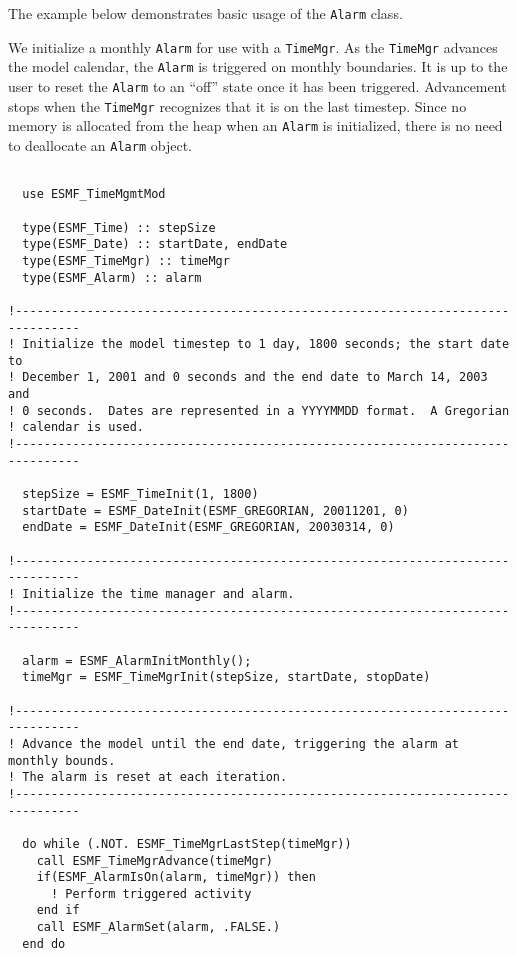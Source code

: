 
The example below demonstrates basic usage of the {\tt Alarm} class.

We initialize a monthly {\tt Alarm} for use with a {\tt TimeMgr}.  As the {\tt TimeMgr} advances 
the model calendar, the {\tt Alarm} is triggered on monthly boundaries.  It is up to the user to 
reset the {\tt Alarm} to an ``off'' state once it has been triggered.  Advancement
stops when the {\tt TimeMgr} recognizes that it is on the last timestep.  Since no memory is allocated 
from the heap when an {\tt Alarm} is initialized, there is no need to deallocate an {\tt Alarm} object.

\begin{verbatim}

  use ESMF_TimeMgmtMod

  type(ESMF_Time) :: stepSize
  type(ESMF_Date) :: startDate, endDate
  type(ESMF_TimeMgr) :: timeMgr
  type(ESMF_Alarm) :: alarm

!-------------------------------------------------------------------------------    
! Initialize the model timestep to 1 day, 1800 seconds; the start date to 
! December 1, 2001 and 0 seconds and the end date to March 14, 2003 and 
! 0 seconds.  Dates are represented in a YYYYMMDD format.  A Gregorian 
! calendar is used.
!-------------------------------------------------------------------------------

  stepSize = ESMF_TimeInit(1, 1800)
  startDate = ESMF_DateInit(ESMF_GREGORIAN, 20011201, 0)
  endDate = ESMF_DateInit(ESMF_GREGORIAN, 20030314, 0)
      
!-------------------------------------------------------------------------------    
! Initialize the time manager and alarm.
!-------------------------------------------------------------------------------

  alarm = ESMF_AlarmInitMonthly();
  timeMgr = ESMF_TimeMgrInit(stepSize, startDate, stopDate)

!-------------------------------------------------------------------------------    
! Advance the model until the end date, triggering the alarm at monthly bounds.
! The alarm is reset at each iteration.
!-------------------------------------------------------------------------------

  do while (.NOT. ESMF_TimeMgrLastStep(timeMgr))
    call ESMF_TimeMgrAdvance(timeMgr)
    if(ESMF_AlarmIsOn(alarm, timeMgr)) then
      ! Perform triggered activity
    end if
    call ESMF_AlarmSet(alarm, .FALSE.)
  end do

\end{verbatim}







